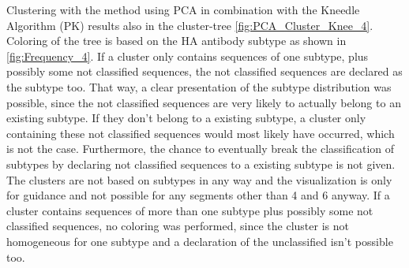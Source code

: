 Clustering with the method using \gls{PCA} in combination with the Kneedle Algorithm (PK) results also in the cluster-tree \autoref{fig:PCA_Cluster_Knee_4}. Coloring of the tree is based on the \gls{HA} antibody subtype as shown in \autoref{fig:Frequency_4}. If a cluster only contains sequences of one subtype, plus possibly some not classified sequences, the not classified sequences are declared as the subtype too. That way, a clear presentation of the subtype distribution was possible, since the not classified sequences are very likely to actually belong to an existing subtype. If they don't belong to a existing subtype, a cluster only containing these not classified sequences would most likely have occurred, which is not the case. Furthermore, the chance to eventually break the classification of subtypes by declaring not classified sequences to a existing subtype is not given. The clusters are not based on subtypes in any way and the visualization is only for guidance and not possible for any segments other than 4 and 6 anyway. If a cluster contains sequences of more than one subtype plus possibly some not classified sequences, no coloring was performed, since the cluster is not homogeneous for one subtype and a declaration of the unclassified isn't possible too. 

\begin{table}[!hbt]
    \centering
    \caption[Anomalies in Segment 4 Cluster 29 (\Acrshort{PCA})]{\textbf{Anomalies in Segment 4 Cluster 29 (\Acrshort{PCA}).} The \glspl{MSA} mean distance of the given sequences in comparison to a sample of H9 sequences of the same cluster and a sample of unclassified sequences present in other clusters. Only the first 20 columns are presented here, the full table can be found in the \href{https://github.com/ahenoch/Masterthesis.git}{Projects GitHub Repository}.}
    \label{tab:PCA_Error_4_29}
\end{table}

